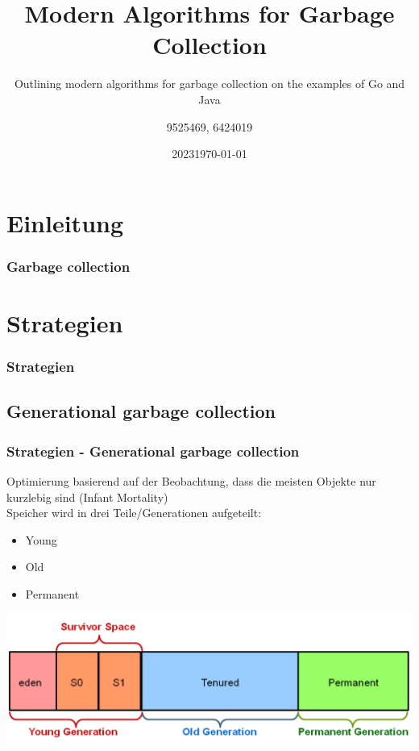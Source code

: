 \documentclass{beamer}
\title{Modern Algorithms for Garbage Collection}
\subtitle{Outlining modern algorithms for garbage collection on the examples of Go and Java}
\date[2023]{2023}
\author{9525469, 6424019}
\institute[DHBW Mosbach]{DHBW Mosbach}
\date{\today}
\begin{document}
    
    \frame{\titlepage}

    \tableofcontents
    
	\section{Einleitung}
        \begin{frame}
            \frametitle{Garbage collection}
        \end{frame}

    \section{Strategien}
        \begin{frame}
            \frametitle{Strategien}
        \end{frame}

        \subsection{Generational garbage collection}
            \begin{frame}
                \frametitle{Strategien - Generational garbage collection}
                Optimierung basierend auf der Beobachtung, dass die meisten Objekte nur kurzlebig sind (Infant Mortality)\\
                Speicher wird in drei Teile/Generationen aufgeteilt:
                \begin{itemize}
                    \item Young
                    \item Old
                    \item Permanent
                \end{itemize}
                \includegraphics[width=\textwidth]{images/GenerationalGCHeapStructure.png}
            \end{frame}
\end{document}
